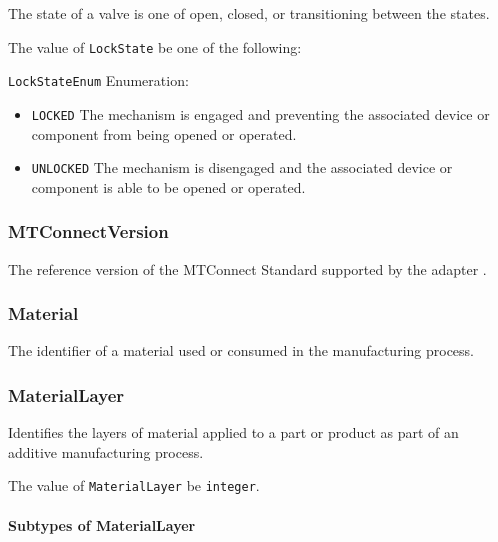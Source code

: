 The state of a valve is one of open, closed, or transitioning between the states.


The value of \texttt{LockState} \MUST be one of the following: 


\texttt{LockStateEnum} Enumeration:

\begin{itemize}
\item \texttt{LOCKED} \newline The mechanism is engaged and preventing the associated device or component from being opened or operated. 
\item \texttt{UNLOCKED} \newline The mechanism is disengaged and the associated device or component is able to be opened or operated. 
\end{itemize}



\subsubsection{MTConnectVersion}
\label{sec:MTConnectVersion}



The reference version of the MTConnect Standard supported by the \gls{adapter}
.



\subsubsection{Material}
\label{sec:Material}



The identifier of a material used or consumed in the manufacturing process.



\subsubsection{MaterialLayer}
\label{sec:MaterialLayer}



Identifies the layers of material applied to a part or product as part of an additive manufacturing process.


The value of \texttt{MaterialLayer} \MUST be \texttt{integer}.


\paragraph{Subtypes of MaterialLayer}\mbox{}
\label{sec:Subtypes of MaterialLayer}


